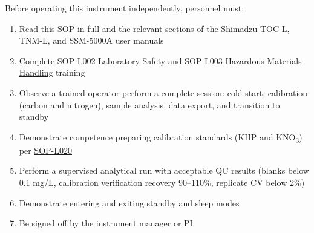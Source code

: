 \documentclass[
  11pt,
  letterpaper,
]{article}
\providecommand{\tightlist}{%
  \setlength{\itemsep}{0pt}\setlength{\parskip}{0pt}}
\begin{document}
Before operating this instrument independently, personnel must:

\begin{enumerate}
\def\labelenumi{\arabic{enumi}.}
\tightlist
\item
  Read this SOP in full and the relevant sections of the Shimadzu TOC-L,
  TNM-L, and SSM-5000A user manuals
\item
  Complete \href{SOP-L002-laboratory-safety.qmd}{SOP-L002 Laboratory
  Safety} and \href{SOP-L003-hazardous-materials-handling.qmd}{SOP-L003
  Hazardous Materials Handling} training
\item
  Observe a trained operator perform a complete session: cold start,
  calibration (carbon and nitrogen), sample analysis, data export, and
  transition to standby
\item
  Demonstrate competence preparing calibration standards (KHP and
  KNO\textsubscript{3}) per
  \href{SOP-L020-reagent-standard-preparation.qmd}{SOP-L020}
\item
  Perform a supervised analytical run with acceptable QC results (blanks
  below 0.1 mg/L, calibration verification recovery 90--110\%, replicate
  CV below 2\%)
\item
  Demonstrate entering and exiting standby and sleep modes
\item
  Be signed off by the instrument manager or PI
\end{enumerate}
\end{document}
